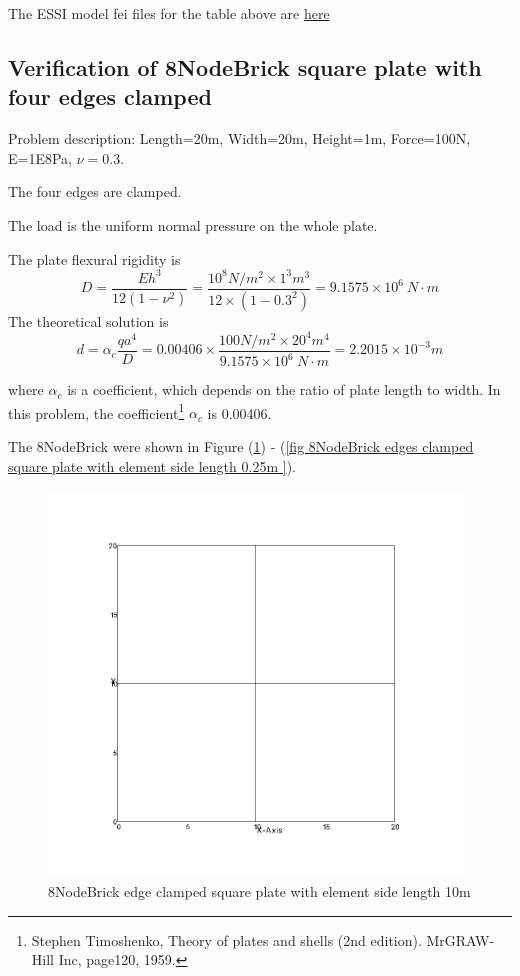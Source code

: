 \documentclass[fleqn,11pt,letter]{article}
\begin{document}
The ESSI model fei files for the table above are \href{https://github.com/yuan-energy/ESSI_Verification/blob/master/8NodeBrick/cantilever_different_element_number/cantilever_different_element_number.tar.gz?raw=true}{here}






\newpage
\subsection{Verification of 8NodeBrick square plate with four edges clamped}

Problem description: Length=20m, Width=20m, Height=1m, Force=100N, E=1E8Pa, $\nu=0.3$. 

The four edges are clamped. 

The load is the uniform normal pressure on the whole plate. 


The plate flexural rigidity is 
\begin{equation}
  D=\frac{Eh^3}{12(1-\nu^2)}=\frac{10^8 N/m^2 \times 1^3 m^3 }{12 \times (1-0.3^2) }= 9.1575 \times 10^6 \ N\cdot m
\end{equation}
The theoretical solution is 
\begin{equation}
  d=\alpha_c \frac{q a^4}{D}=0.00406\times \frac{100 N/m^2 \times 20^4 m^4}{9.1575 \times 10^6 \ N\cdot m}=2.2015\times 10^{-3} m
\end{equation}

where $\alpha_c$ is a coefficient, which depends on the ratio of plate length to width. In this problem, the coefficient\footnote{Stephen Timoshenko, Theory of plates and shells (2nd edition). MrGRAW-Hill Inc, page120, 1959.} $\alpha_c$ is 0.00406.


The 8NodeBrick were shown in Figure (\ref{fig 8NodeBrick edges clamped square plate with element side length 10m }) - (\ref{fig 8NodeBrick edges clamped square plate with element side length 0.25m }). 


\begin{figure}[H]
  \centering
  \includegraphics[width=11cm]{../Figure_files/8NodeBrick/square_plate1.png}
  \caption{8NodeBrick edge clamped square plate with element side length 10m }
  \label{fig 8NodeBrick edges clamped square plate with element side length 10m }
\end{figure}
\end{document}
